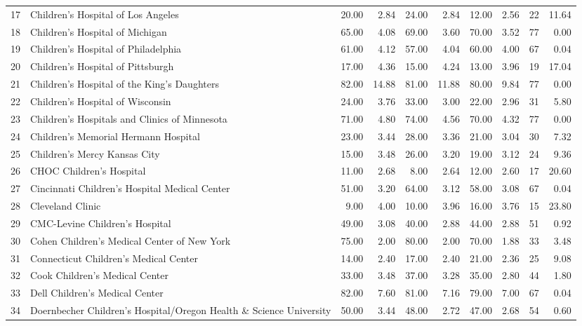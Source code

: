 \begin{table}[ht]
\begin{tabular}{rlrrrrrrrr}
  17 & Children's Hospital of Los Angeles & 20.00 & 2.84 & 24.00 & 2.84 & 12.00 & 2.56 &  22 & 11.64 \\ 
  18 & Children's Hospital of Michigan & 65.00 & 4.08 & 69.00 & 3.60 & 70.00 & 3.52 &  77 & 0.00 \\ 
  19 & Children's Hospital of Philadelphia & 61.00 & 4.12 & 57.00 & 4.04 & 60.00 & 4.00 &  67 & 0.04 \\ 
  20 & Children's Hospital of Pittsburgh & 17.00 & 4.36 & 15.00 & 4.24 & 13.00 & 3.96 &  19 & 17.04 \\ 
  21 & Children's Hospital of the King's Daughters & 82.00 & 14.88 & 81.00 & 11.88 & 80.00 & 9.84 &  77 & 0.00 \\ 
  22 & Children's Hospital of Wisconsin & 24.00 & 3.76 & 33.00 & 3.00 & 22.00 & 2.96 &  31 & 5.80 \\ 
  23 & Children's Hospitals and Clinics of Minnesota & 71.00 & 4.80 & 74.00 & 4.56 & 70.00 & 4.32 &  77 & 0.00 \\ 
  24 & Children's Memorial Hermann Hospital & 23.00 & 3.44 & 28.00 & 3.36 & 21.00 & 3.04 &  30 & 7.32 \\ 
  25 & Children's Mercy Kansas City & 15.00 & 3.48 & 26.00 & 3.20 & 19.00 & 3.12 &  24 & 9.36 \\ 
  26 & CHOC Children's Hospital & 11.00 & 2.68 & 8.00 & 2.64 & 12.00 & 2.60 &  17 & 20.60 \\ 
  27 & Cincinnati Children's Hospital Medical Center & 51.00 & 3.20 & 64.00 & 3.12 & 58.00 & 3.08 &  67 & 0.04 \\ 
  28 & Cleveland Clinic & 9.00 & 4.00 & 10.00 & 3.96 & 16.00 & 3.76 &  15 & 23.80 \\ 
  29 & CMC-Levine Children's Hospital & 49.00 & 3.08 & 40.00 & 2.88 & 44.00 & 2.88 &  51 & 0.92 \\ 
  30 & Cohen Children's Medical Center of New York & 75.00 & 2.00 & 80.00 & 2.00 & 70.00 & 1.88 &  33 & 3.48 \\ 
  31 & Connecticut Children's Medical Center & 14.00 & 2.40 & 17.00 & 2.40 & 21.00 & 2.36 &  25 & 9.08 \\ 
  32 & Cook Children's Medical Center & 33.00 & 3.48 & 37.00 & 3.28 & 35.00 & 2.80 &  44 & 1.80 \\ 
  33 & Dell Children's Medical Center & 82.00 & 7.60 & 81.00 & 7.16 & 79.00 & 7.00 &  67 & 0.04 \\ 
  34 & Doernbecher Children's Hospital/Oregon Health \& Science University & 50.00 & 3.44 & 48.00 & 2.72 & 47.00 & 2.68 &  54 & 0.60 \\ 

\end{tabular}
\end{table}
